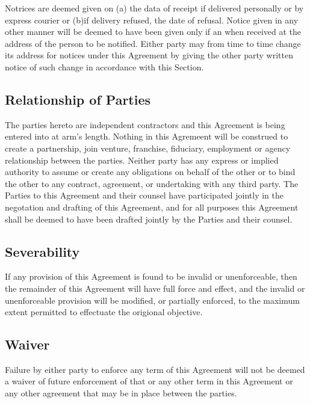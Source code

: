\documentclass[letterpaper,10pt,openany,oneside,english]{sphinxmanual}
\begin{document}
Notrices are deemed given on (a) the data of receipt if delivered personally or by express courier or (b)if delivery refused, the date of refusal. Notice given in any other manner will be deemed to have been given only if an when received at the address of the person to be notified. Either party may from time to time change its address for notices under this Agreement by giving the other party written notice of such change in accordance with this Section.


\subsection{Relationship of Parties}
\label{\detokenize{7-miscellaneous:relationship-of-parties}}
The parties hereto are independent      contractors and this Agreement is being entered into at arm’s length. Nothing in this Agremeent will be construed to create a partnership, join venture, franchise, fiduciary, employment or agency relationship between the parties. Neither party has any express or implied authority to assume or create any obligations on behalf of the other or to bind the other to any contract, agreement, or undertaking with any third party. The Parties to this Agreement and their counsel have participated jointly in the negotation and drafting of this Agreement, and for all purposes this Agreement shall be deemed to have been drafted jointly by the Parties and their counsel.


\subsection{Severability}
\label{\detokenize{7-miscellaneous:severability}}
If any provision of this Agreement is found to be invalid or unenforceable, then the remainder of this Agreement will have full force and effect, and the invalid or unenforceable provision will be modified, or partially enforced, to the maximum extent permitted to effectuate the origional objective.


\subsection{Waiver}
\label{\detokenize{7-miscellaneous:waiver}}
Failure by either party to enforce any term of this Agreement will not be deemed a waiver of future enforcement of that or any other term in this Agreement or any other agreement that may be in place between the parties.
\end{document}

